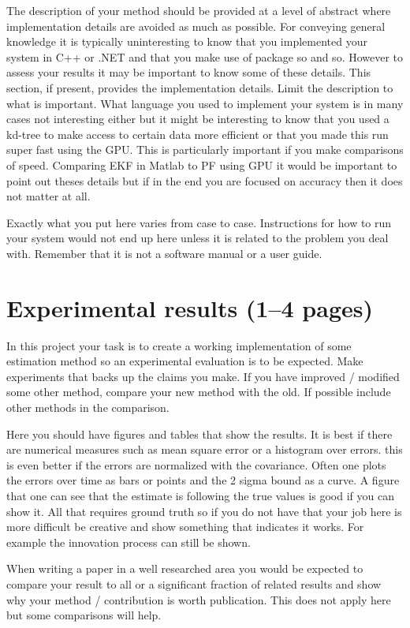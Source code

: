 \documentclass[a4paper,12pt]{article}
\begin{document}
The description of your method should be provided at a level of
abstract where implementation details are avoided as much as
possible. For conveying general knowledge it is typically
uninteresting to know that you implemented your system in C++ or .NET
and that you make use of package so and so. However to assess your
results it may be important to know some of these details. This
section, if present, provides the implementation details. Limit the
description to what is important.  What language you used to implement
your system is in many cases not interesting either but it might be
interesting to know that you used a kd-tree to make access to certain
data more efficient or that you made this run super fast using the
GPU.  This is particularly important if you make comparisons of speed.
Comparing EKF in Matlab to PF using GPU it would be important to point
out theses details but if in the end you are focused on accuracy then
it does not matter at all.

Exactly what you put here varies from case to case. Instructions for
how to run your system would not end up here unless it is related to
the problem you deal with. Remember that it is not a software manual
or a user guide.

\section{Experimental results (1--4 pages)}
\label{sec:exps}

In this project your task is to create a working implementation of some estimation method so an experimental evaluation is to be expected. Make
experiments that backs up the claims you make. If you have improved /
modified some other method, compare your new method with the old. If
possible include other methods in the comparison.

Here you should have figures and tables that show the results.  It is
best if there are numerical measures such as mean square error or a
histogram over errors.  this is even better if the errors are
normalized with the covariance.  Often one plots the errors over time
as bars or points and the 2 sigma bound as a curve.  A figure that one
can see that the estimate is following the true values is good if you
can show it.  All that requires ground truth so if you do not have
that your job here is more difficult be creative and show something
that indicates it works.  For example the innovation process can still
be shown.

When writing a paper in a well researched area you would be expected
to compare your result to all or a significant fraction of related
results and show why your method / contribution is worth publication.
This does not apply here but some comparisons will help.
\end{document}
